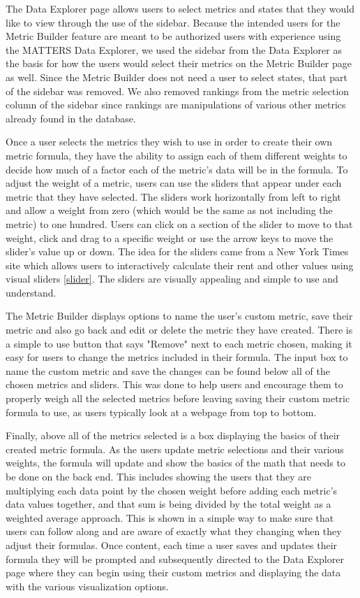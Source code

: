			The Data Explorer page allows users to select metrics and states that they would like to view through the use of the sidebar. 
			Because the intended users for the Metric Builder feature are meant to be authorized users with 
			experience using the MATTERS Data Explorer, we used the sidebar from the Data Explorer as the 
			basis for how the users would select their metrics on the Metric Builder page as well. Since the Metric Builder does not need a user to select states, 
			that part of the sidebar was removed. We also removed rankings from the metric selection column of the sidebar since rankings are manipulations of 
			various other metrics already found in the database. 
			
			Once a user selects the metrics they wish to use in order to create their own metric formula, they have the ability to assign each of them different weights 
			to decide how much of a factor each of the metric's data will be in the formula. To adjust the weight of a metric, users can use the sliders that appear under 
			each metric that they have selected. The sliders work horizontally from left to right and allow a weight from zero (which would be the same as not including the metric) 
			to one hundred. Users can click on a section of the slider to move to that weight, click and drag to a specific weight or use the arrow keys to move the slider's value up or down. 
			The idea for the sliders came from a New York Times site which allows users to interactively calculate their rent and other values using visual sliders \ref{slider}. The sliders are 
			visually appealing and simple to use and understand.
			
			The Metric Builder displays options to name the user's custom metric, save their metric and also go back and edit or delete the metric they have created. There is a 
			simple to use button that says "Remove" next to each metric chosen, making it easy for users to change the metrics included in their formula. The input 
			box to name the custom metric and save the changes can be found below all of the chosen metrics and sliders. This was done to help users and encourage them to 
			properly weigh all the selected metrics before leaving saving their custom metric formula to use, as users typically look at a webpage from top to bottom.
		
			Finally, above all of the metrics selected is a box displaying the basics of their created metric formula. As the users update metric selections and their various weights,
			the formula will update and show the basics of the math that needs to be done on the back end. This includes showing the users that they are 
			multiplying each data point by the chosen weight before adding each metric's data values together, and that sum is being divided by the total weight as a weighted average approach. 
			This is shown in a simple way to make sure that users can follow along and are aware of exactly what they changing when they adjust their formulas. 
			Once content, each time a user saves and updates their formula they will be prompted and subsequently directed to the Data Explorer page where they can begin using their custom metrics and displaying the data with the various visualization options.
			

